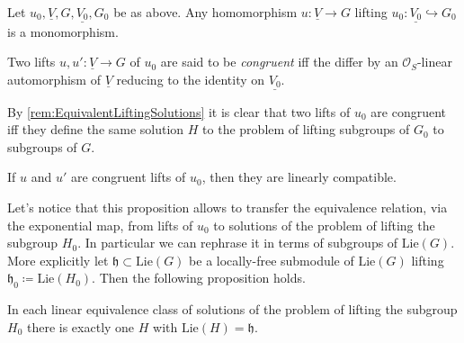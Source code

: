 \begin{lem}
	Let $u_0, \underline{V}, G, \underline{V_0}, G_0$ be as above.
	Any homomorphism $u\colon \underline{V} \to G$ lifting 
	$u_0\colon \underline{V_0} \hookrightarrow G_0$
	is a monomorphism.
\end{lem} 


\begin{defn}
	Two lifts $u, u'\colon \underline{V} \to G$ of $u_0$ are said to
	be {\em congruent} iff the differ by an $\mathcal{O}_{ S }$-linear
	automorphism of $\underline{V}$ reducing to the identity on $\underline{V_0}$.
\end{defn}


\begin{rem}[]
	By \cref{rem:EquivalentLiftingSolutions} it is clear that
	two lifts of $u_0$ are congruent iff they define the same solution
	$H$ to the problem of lifting subgroups of $G_0$ to subgroups of $G$.
\end{rem}


\begin{lem}\label{lem:CongruentLinComp}
	If $u$ and $u'$ are congruent lifts of $u_0$, then
	they are linearly compatible.
\end{lem} 


\begin{rem}[]
	Let's notice that this proposition allows to
	transfer the equivalence relation, via the exponential map,
	from lifts of $u_0$ to solutions of the problem of lifting
	the subgroup $H_0$.
	In particular we can rephrase it in terms of subgroups
	of $\mathrm{Lie}(G)$. More explicitly
	let $\mathfrak{h} \subset \mathrm{Lie}(G)$ be a locally-free
	submodule of $\mathrm{Lie}(G)$ lifting
	$\mathfrak{h}_0 \coloneqq \mathrm{Lie}(H_0)$.
	Then the following proposition holds.
\end{rem}


\begin{prop}\label{prop:equivClassFiltration}
	In each linear equivalence class of solutions of
	the problem of lifting the subgroup $H_0$
	there is exactly one $H$ with 
	$\mathrm{Lie}(H) = \mathfrak{h}$.
\end{prop}



